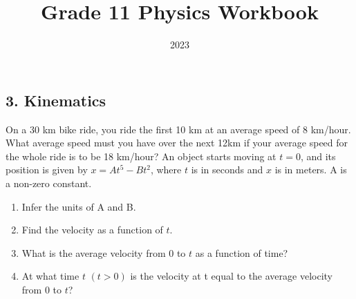 \documentclass[12pt,addpoints]{exam}
\date{2023}
\begin{document}
	\title{Grade 11 Physics Workbook}
	\maketitle
	
	\begin{center}
		\section*{3. Kinematics}
		\begin{questions}
			\question On a 30 km bike ride, you ride the first 10 km at an average speed of 8 km/hour. What average speed must you have over the next 12km if your average speed for the whole ride is to be 18 km/hour?\vspace{1in}
			\question An object starts moving at $t = 0$, and its position is given by $x = At^5 - Bt^2$, where $t$ is in seconds and $x$ is in meters. A is a non-zero constant.
			\begin{enumerate}[label=(\alph*)]
				\item Infer the units of A and B.\vspace{0.8in}
				\item Find the velocity as a function of $t$.\vspace{1in}
				\item What is the average velocity from $0$ to $t$ as a
				function of time?\vspace{1in}
				\item At what time $t$ $(t > 0)$ is the velocity at t
				equal to the average velocity from $0$ to $t$?
			\end{enumerate}
			\question 
		\end{questions}
		

	\end{center}		
\end{document}
